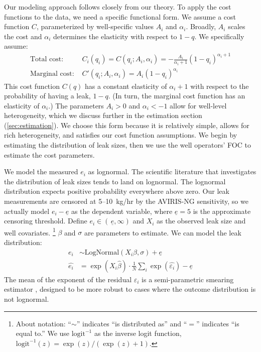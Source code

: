 \documentclass[12pt,oneside,letterpaper]{article}
\theoremstyle{definition}
\begin{document}
\begin{refsection}
Our modeling approach follows closely from our theory.
To apply the cost functions to the data, we need a specific functional form.
We assume a cost function \(C\), parameterized by well-specific values \(A_i\) and \(\alpha_i\).
Broadly, \(A_i\) scales the cost and \(\alpha_i\) determines the elasticity with respect to \(1-q\).
We specifically assume:
\begin{align*}
\text{Total cost: }& C_i(q_i) = C(q_i; A_i, \alpha_i) = -\frac{A_i}{\alpha_i + 1} (1 - q_i) ^{\alpha_i + 1}\\
\text{Marginal cost: }& C'(q_i; A_i,\alpha_i) = A_i (1 - q_i) ^{\alpha_i}
\end{align*}
This cost function \(C(q)\) has a constant elasticity of \(\alpha_i + 1\) with respect to the probability of having a leak, \(1 - q\).
(In turn, the marginal cost function has an elasticity of \(\alpha_i\).)
The parameters \(A_i > 0\) and \(\alpha_i < -1\) allow for well-level heterogeneity, which we discuss further in the estimation section (\ref{sec:estimation}).
We choose this form because it is relatively simple, allows for rich heterogeneity, and satisfies our cost function assumptions.
We begin by estimating the distribution of leak sizes, then we use the well operators' \gls{FOC} to estimate the cost parameters.


We model the measured \(e_i\) as lognormal.
The scientific literature that investigates the distribution of leak sizes tends to land on lognormal.
The lognormal distribution expects positive probability everywhere above zero.
Our leak measurements are censored at 5--10~kg/hr by the \gls{AVIRIS-NG} sensitivity, so we actually model \(e_i - \underline{e}\) as the dependent variable, where \(\underline{e} = 5\) is the approximate censoring threshold.
Define \(e_i \in (\,\underline{e}, \infty)\) and \(X_i\) as the observed leak size and well covariates.%
\footnote{
About notation: ``\(\sim\)'' indicates ``is distributed as'' and ``\(=\)'' indicates ``is equal to.''
We use \(\text{logit}^{-1}\) as the inverse logit function,  \(\text{logit}^{-1}(z) = \exp(z) / (\exp(z) + 1)\).
}
\(\beta\) and \(\sigma\) are parameters to estimate.
We can model the leak distribution:
\begin{align*}
e_i &\sim \text{LogNormal}(X_i \beta, \sigma) + \underline{e}\\
\hat{e_i} &= \exp( X_i \hat{\beta}) \cdot \frac{1}{N}\sum_i \exp(\hat{\varepsilon_i}) - \underline{e}
\end{align*}
The mean of the exponent of the residual \(\varepsilon_i\) is a semi-parametric smearing estimator
\parencite{Manning/Duan/Rogers:1987}, designed to be more robust to cases where the outcome distribution is not lognormal.


\end{refsection}
\end{document}
